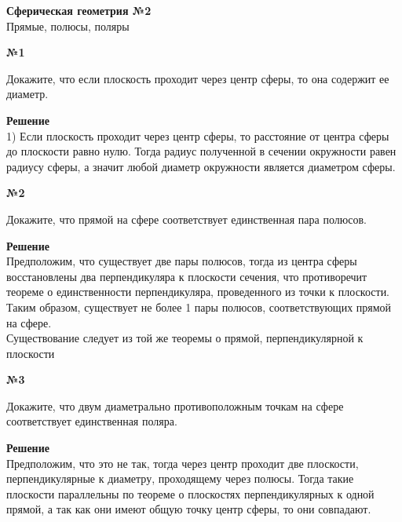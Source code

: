 


    \begin{center}
        \textbf{Сферическая геометрия №2}\\
        Прямые, полюсы, поляры
    \end{center}

    \begin{center}
        \textbf{№1}
    \end{center}

    Докажите, что если плоскость проходит через центр сферы, то она содержит ее диаметр.

    \textbf{Решение}\\

    1) Если плоскость проходит через центр сферы, то расстояние от центра сферы до плоскости равно нулю.
    Тогда радиус полученной в сечении окружности равен радиусу сферы, а значит любой диаметр окружности является диаметром сферы.

    \begin{center}
        \textbf{№2}
    \end{center}

    Докажите, что прямой на сфере соответствует единственная пара полюсов.

    \textbf{Решение}\\

    Предположим, что существует две пары полюсов, тогда из центра сферы восстановлены два перпендикуляра к плоскости сечения,
    что противоречит теореме о единственности перпендикуляра, проведенного из точки к плоскости.\\

    Таким образом, существует не более 1 пары полюсов, соответствующих прямой на сфере.\\

    Существование следует из той же теоремы о прямой, перпендикулярной к плоскости

    \begin{center}
        \textbf{№3}
    \end{center}

    Докажите, что двум диаметрально противоположным точкам на сфере соответствует единственная поляра.

    \textbf{Решение}\\

    Предположим, что это не так, тогда через центр проходит две плоскости, перпендикулярные к диаметру, проходящему через полюсы.
    Тогда такие плоскости параллельны по теореме о плоскостях перпендикулярных к одной прямой,
    а так как они имеют общую точку центр сферы, то они совпадают.

